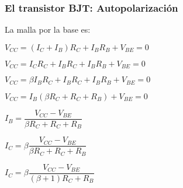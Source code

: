 \begin{frame}[t]
    \frametitle{El transistor BJT: Autopolarización}

    \begin{multicols}{2}
        \begin{figure}[H]
            \centering
        \end{figure}

        \newpage
        La malla por la base es:

        \vspace{3mm}
        $ V_{CC} = (I_C + I_B) R_C + I_B R_B + V_{BE} = 0 $

        \vspace{3mm}
        $ V_{CC} = I_C R_C + I_B R_C + I_B R_B + V_{BE} = 0 $

        \vspace{3mm}
        $ V_{CC} = \beta I_B R_C + I_B R_C + I_B R_B + V_{BE} = 0 $

        \vspace{3mm}
        $ V_{CC} = I_B (\beta R_C + R_C + R_B) + V_{BE} = 0 $

        \vspace{3mm}
        $ I_B = \dfrac{V_{CC} - V_{BE}}{\beta R_C + R_C + R_B} $

        \vspace{3mm}
        $ I_C = \beta \dfrac{V_{CC} - V_{BE}}{\beta R_C + R_C + R_B} $

        \vspace{3mm}
        $ I_C = \beta \dfrac{V_{CC} - V_{BE}}{(\beta + 1) R_C + R_B} $

        \vfill
    \end{multicols}


\end{frame}

